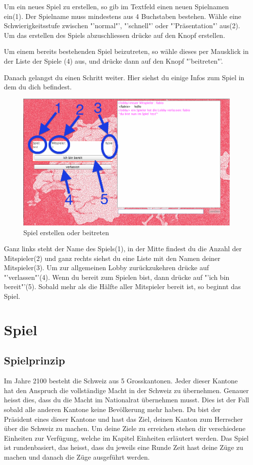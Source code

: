 \documentclass[ngerman, 12pt, pdftex]{scrartcl}[2006/07/30]
\begin{document}
Um ein neues Spiel zu erstellen, so gib im Textfeld einen neuen Spielnamen ein(1).
Der Spielname muss mindestens aus 4 Buchstaben bestehen.
W\"{a}hle eine Schwierigkeitsstufe zwischen "'normal"', "'schnell"' oder "'Präsentation"' aus(2).
Um das erstellen des Spiels abzuschliessen dr\"{u}cke auf den Knopf erstellen.

Um einem bereits bestehenden Spiel beizutreten, so w\"{a}hle dieses per Mausklick in der Liste der Spiele (4) aus, und dr\"{u}cke dann auf den Knopf "'beitreten"'.

Danach gelangst du einen Schritt weiter. Hier siehst du einige Infos zum Spiel in dem du dich befindest.

\begin{figure}[h]
\centering
\includegraphics[scale=0.3]{lobby/spielinfos.png}
\caption{Spiel erstellen oder beitreten}
\end{figure}

 Ganz links steht der Name des Spiels(1), in der Mitte findest du die Anzahl der Mitspieler(2) und ganz rechts siehst du eine Liste mit den Namen deiner Mitspieler(3).
Um zur allgemeinen Lobby zur\"{u}ckzukehren dr\"{u}cke auf "'verlassen"'(4).
Wenn du bereit zum Spielen bist, dann dr\"{u}cke auf "'ich bin bereit"'(5). Sobald mehr als die Hälfte aller Mitspieler bereit ist, so beginnt das Spiel.

\newpage

\section{Spiel}
\subsection{Spielprinzip}
Im Jahre 2100 besteht die Schweiz aus 5 Grosskantonen. Jeder dieser Kantone hat den Anspruch die vollständige Macht in der Schweiz zu übernehmen.
Genauer heisst dies, dass du die Macht im Nationalrat übernehmen musst. Dies ist der Fall sobald alle anderen Kantone keine Bevölkerung mehr haben.
Du bist der Präsident eines dieser Kantone und hast das Ziel, deinen Kanton zum Herrscher über die Schweiz zu machen. 
Um deine Ziele zu erreichen stehen dir verschiedene Einheiten zur Verfügung, welche im Kapitel Einheiten erläutert werden.
Das Spiel ist rundenbasiert, das heisst, dass du jeweils eine Runde Zeit hast deine Züge zu machen und danach die Züge ausgeführt werden.
\end{document}
